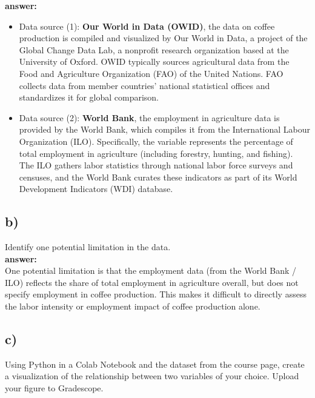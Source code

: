 \documentclass[12pt]{article}
\begin{document}
\textbf{answer:}\\
\begin{itemize}
    \item Data source (1): \textbf{Our World in Data (OWID)}, the data on coffee production is compiled and visualized by Our World in Data, a project of the Global Change Data Lab, a nonprofit research organization based at the University of Oxford. OWID typically sources agricultural data from the Food and Agriculture Organization (FAO) of the United Nations. FAO collects data from member countries’ national statistical offices and standardizes it for global comparison.
    \item Data source (2): \textbf{World Bank}, the employment in agriculture data is provided by the World Bank, which compiles it from the International Labour Organization (ILO). Specifically, the variable represents the percentage of total employment in agriculture (including forestry, hunting, and fishing). The ILO gathers labor statistics through national labor force surveys and censuses, and the World Bank curates these indicators as part of its World Development Indicators (WDI) database.
\end{itemize}

\subsection*{b)} Identify one potential limitation in the data.\\

\textbf{answer:}\\

One potential limitation is that the employment data (from the World Bank / ILO) reflects the share of total employment in agriculture overall, but does not specify employment in coffee production. This makes it difficult to directly assess the labor intensity or employment impact of coffee production alone.

\subsection*{c)} Using Python in a Colab Notebook and the dataset from the course page, create a visualization of the relationship between two variables of your choice. Upload your figure to Gradescope.
\end{document}
